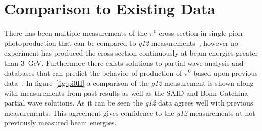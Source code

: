 \documentclass{aip-cp}
\def\g12{\emph{g12}}
\begin{document}
\section{Comparison to Existing Data}
There has been multiple measurements of the $\pi^0$ cross-section in single pion photoproduction that can be compared to \g12 measurements~\cite{Dugger07,ELSA05,ELSA11,Graal,LEPS,brem}, however no experiment has produced the cross-section continuously at beam energies greater than 3~GeV. Furthermore there exists solutions to partial wave analysis and databases that can predict the behavior of production of $\pi^0$ based upon previous data~\cite{BonnGat,SAID}. In figure~\ref{fig:pi0II} a comparison of the \g12 measurement is shown along with measurements from past results as well as the SAID and Bonn-Gatchina partial wave solutions. As it can be seen the \g12 data agrees well with previous measurements. This agreement gives confidence to the \g12 measurements at not previously measured beam energies. 
\end{document}
